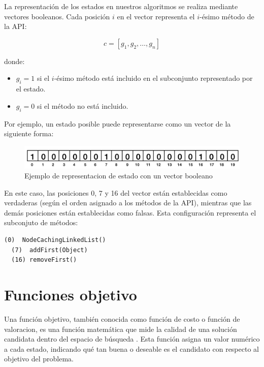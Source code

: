 La representación de los estados en nuestros algoritmos se realiza mediante vectores booleanos. Cada posición $i$ en el vector representa el $i$-ésimo método de la API:

\[
c = [g_1, g_2, \ldots, g_n]
\]

donde:
\begin{itemize}
    \item $g_i = 1$ si el $i$-ésimo método está incluido en el subconjunto representado por el estado.
    \item $g_i = 0$ si el método no está incluido.
\end{itemize}

Por ejemplo, un estado posible puede representarse como un vector de la siguiente forma:


\begin{figure}[H]
  \centering
  \includegraphics[width=1.0\textwidth]{images/cromosoma.png}
  \caption{Ejemplo de representacion de estado con un vector booleano}
  \label{fig:cromosoma}
\end{figure}

En este caso, las posiciones 0, 7 y 16 del vector están establecidas como verdaderas (según el orden asignado a los métodos de la API), mientras que las demás posiciones están establecidas como falsas. Esta configuración representa el subconjuto de métodos:
\vspace{5pt} 

\begin{lstlisting}[numbers=none, caption=Métodos generadores de objetos que representa el cromosoma de la Figura 2, captionpos=b, frame=tb , xleftmargin=0pt, basicstyle=\scriptsize]
  (0)  NodeCachingLinkedList()
  (7)  addFirst(Object)
  (16) removeFirst()
\end{lstlisting}

\section{Funciones objetivo}
\label{sec:fitness}

Una función objetivo, también conocida como función de costo o función de valoracion, es una función matemática que mide la calidad de una solución candidata dentro del espacio de búsqueda \cite{Russell:2009}. Esta función asigna un valor numérico a cada estado, indicando qué tan buena o deseable es el candidato con respecto al objetivo del problema.

